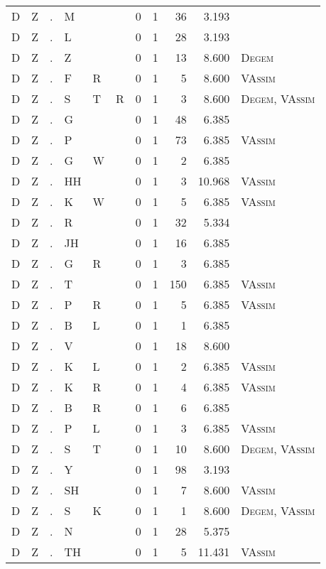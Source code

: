 \begin{longtable}{r@{ } r@{ } c@{ } l@{ } l@{ } l@{ } r r r r l }
D & Z & . & M &  &  & 0 & 1 & 36 & 3.193 &  \\
D & Z & . & L &  &  & 0 & 1 & 28 & 3.193 &  \\
D & Z & . & Z &  &  & 0 & 1 & 13 & 8.600 & \textsc{Degem} \\
D & Z & . & F & R &  & 0 & 1 & 5 & 8.600 & \textsc{VAssim} \\
D & Z & . & S & T & R & 0 & 1 & 3 & 8.600 & \textsc{Degem}, \textsc{VAssim} \\
D & Z & . & G &  &  & 0 & 1 & 48 & 6.385 &  \\
D & Z & . & P &  &  & 0 & 1 & 73 & 6.385 & \textsc{VAssim} \\
D & Z & . & G & W &  & 0 & 1 & 2 & 6.385 &  \\
D & Z & . & HH &  &  & 0 & 1 & 3 & 10.968 & \textsc{VAssim} \\
D & Z & . & K & W &  & 0 & 1 & 5 & 6.385 & \textsc{VAssim} \\
D & Z & . & R &  &  & 0 & 1 & 32 & 5.334 &  \\
D & Z & . & JH &  &  & 0 & 1 & 16 & 6.385 &  \\
D & Z & . & G & R &  & 0 & 1 & 3 & 6.385 &  \\
D & Z & . & T &  &  & 0 & 1 & 150 & 6.385 & \textsc{VAssim} \\
D & Z & . & P & R &  & 0 & 1 & 5 & 6.385 & \textsc{VAssim} \\
D & Z & . & B & L &  & 0 & 1 & 1 & 6.385 &  \\
D & Z & . & V &  &  & 0 & 1 & 18 & 8.600 &  \\
D & Z & . & K & L &  & 0 & 1 & 2 & 6.385 & \textsc{VAssim} \\
D & Z & . & K & R &  & 0 & 1 & 4 & 6.385 & \textsc{VAssim} \\
D & Z & . & B & R &  & 0 & 1 & 6 & 6.385 &  \\
D & Z & . & P & L &  & 0 & 1 & 3 & 6.385 & \textsc{VAssim} \\
D & Z & . & S & T &  & 0 & 1 & 10 & 8.600 & \textsc{Degem}, \textsc{VAssim} \\
D & Z & . & Y &  &  & 0 & 1 & 98 & 3.193 &  \\
D & Z & . & SH &  &  & 0 & 1 & 7 & 8.600 & \textsc{VAssim} \\
D & Z & . & S & K &  & 0 & 1 & 1 & 8.600 & \textsc{Degem}, \textsc{VAssim} \\
D & Z & . & N &  &  & 0 & 1 & 28 & 5.375 &  \\
D & Z & . & TH &  &  & 0 & 1 & 5 & 11.431 & \textsc{VAssim} \\

\end{longtable}
